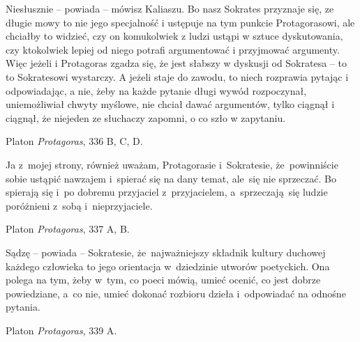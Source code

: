 \documentclass[a4paper,11pt]{article}
\newcommand{\attribA}[1]{#1}
\begin{document}
\vspace{\spaceThree}



\noindent
Niesłusznie -- powiada -- mówisz Kaliaszu. Bo nasz Sokrates przyznaje
się, ze długie mowy to nie jego specjalność i ustępuje na tym punkcie
Protagorasowi, ale chciałby to widzieć, czy on komukolwiek z ludzi
ustąpi w sztuce dyskutowania, czy ktokolwiek lepiej od niego potrafi
argumentować i przyjmować argumenty. Więc jeżeli i Protagoras zgadza
się, że jest słabszy w dyskusji od Sokratesa -- to to Sokratesowi
wystarczy. A jeżeli staje do zawodu, to niech rozprawia pytając i
odpowiadając, a nie, żeby na każde pytanie długi wywód rozpoczynał,
uniemożliwiał chwyty myślowe, nie chciał dawać argumentów, tylko
ciągnął i ciągnął, że niejeden ze słuchaczy zapomni, o co szło w
zapytaniu.


\attribA{Platon \textit{Protagoras}, 336 B, C, D.}

\vspace{\spaceThree}



\noindent
Ja z~mojej strony, również uważam, Protagorasie i~Sokratesie,
że~powinniście sobie ustąpić nawzajem i~spierać się na dany temat,
ale~się nie sprzeczać. Bo spierają się i~po dobremu przyjaciel
z~przyjacielem, a~sprzeczają~się ludzie poróżnieni z~sobą
i~nieprzyjaciele.


\attribA{Platon \textit{Protagoras}, 337 A, B.}

\vspace{\spaceThree}



\noindent
Sądzę -- powiada -- Sokratesie, że~najważniejszy składnik kultury
duchowej każdego człowieka to jego orientacja w~dziedzinie utworów
poetyckich. Ona polega na tym, żeby w~tym, co poeci mówią, umieć
ocenić, co jest dobrze powiedziane, a~co nie, umieć dokonać rozbioru
dzieła i~odpowiadać na odnośne pytania.


\attribA{Platon \textit{Protagoras}, 339 A.}

\vspace{\spaceThree}
\end{document}

